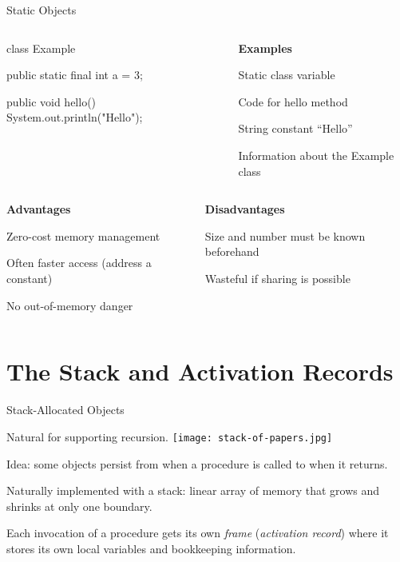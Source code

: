\documentclass{plt}
\begin{document}
\begin{frame}[fragile]{Static Objects}

\begin{columns}
\begin{column}{0.5\textwidth}
\begin{java}
class Example {
  public static final int a = 3;

  public void hello() {
    System.out.println("Hello");
  }
}
\end{java}
\end{column}
\begin{column}{0.5\textwidth}
\textbf{Examples}

\baselineskip
Static class variable

Code for hello method

String constant ``Hello''

Information about the Example class
\end{column}
\end{columns}

\vspace{\baselineskip}

\begin{columns}[t]
\begin{column}{0.5\textwidth}
\baselineskip
\textbf{Advantages}


Zero-cost memory management

Often faster access (address a constant)

No out-of-memory danger

\end{column}
\begin{column}{0.5\textwidth}
\baselineskip
\textbf{Disadvantages}

Size and number must be known beforehand

Wasteful if sharing is possible
\end{column}
\end{columns}

\end{frame}

\part{The Stack and Activation Records}
\frame{\partpage}

\begin{frame}{Stack-Allocated Objects}

Natural for supporting recursion. 
\hfill\texttt{[image: stack-of-papers.jpg]}

Idea: some objects persist from when a procedure is called to
when it returns.

Naturally implemented with a stack: linear array of memory that grows
and shrinks at only one boundary.

Each invocation of a procedure gets its own \emph{frame}
(\emph{activation record}) where it stores its own local variables and
bookkeeping information.

\end{frame}
\end{document}
